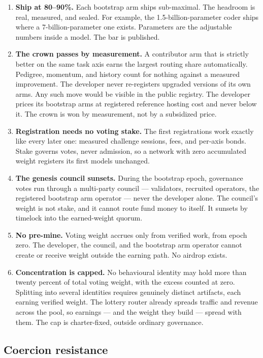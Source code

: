 \documentclass[11pt]{article}
\begin{document}
\begin{enumerate}
\item \textbf{Ship at 80--90\%.} Each bootstrap arm ships
sub-maximal. The headroom is real, measured, and sealed. For
example, the 1.5-billion-parameter coder ships where a
7-billion-parameter one exists. Parameters are the adjustable
numbers inside a model. The bar is published.
\item \textbf{The crown passes by measurement.} A contributor arm
that is strictly better on the same task axis earns the largest
routing share automatically. Pedigree, momentum, and history
count for nothing against a measured improvement. The developer
never re-registers upgraded versions of its own arms. Any such
move would be visible in the public registry. The developer
prices its bootstrap arms at registered reference hosting cost
and never below it. The crown is won by measurement, not by a
subsidized price.
\item \textbf{Registration needs no voting stake.} The first
registrations work exactly like every later one: measured
challenge sessions, fees, and per-axis bonds. Stake governs
votes, never admission, so a network with zero accumulated
weight registers its first models unchanged.
\item \textbf{The genesis council sunsets.} During the bootstrap
epoch, governance votes run through a multi-party council ---
validators, recruited operators, the registered bootstrap arm
operator --- never the developer alone. The council's weight is
not stake, and it cannot route fund money to itself. It sunsets
by timelock into the earned-weight quorum.
\item \textbf{No pre-mine.} Voting weight accrues only from
verified work, from epoch zero. The developer, the council, and
the bootstrap arm operator cannot create or receive weight
outside the earning path. No airdrop exists.
\item \textbf{Concentration is capped.} No behavioural identity
may hold more than twenty percent of total voting weight, with
the excess counted at zero. Splitting into several identities
requires genuinely distinct artifacts, each earning verified
weight. The lottery router already spreads traffic and revenue
across the pool, so earnings --- and the weight they build ---
spread with them. The cap is charter-fixed, outside ordinary
governance.
\end{enumerate}

\subsection{Coercion resistance}
\end{document}
